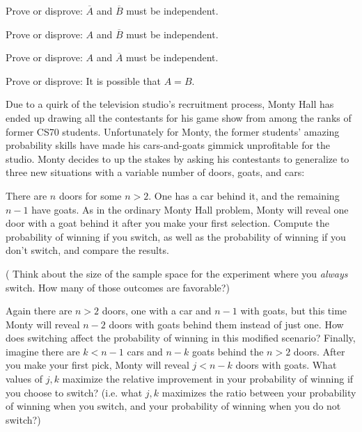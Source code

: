 \documentclass[11pt]{article}
\begin{document}
\begin{Parts}

\Part Prove or disprove: $\overline{A}$ and $\overline{B}$ must be independent.

\Part Prove or disprove: $A$ and $\overline{B}$ must be independent.

\Part Prove or disprove: $A$ and $\overline{A}$ must be independent.

\Part Prove or disprove: It is possible that $A=B$.

\end{Parts}


Due to a quirk of the television studio's recruitment process, Monty Hall has
ended up drawing all the contestants for his game show from among the ranks of
former CS70 students. Unfortunately for Monty, the former students' amazing
probability skills have made his cars-and-goats gimmick unprofitable for the
studio. Monty decides to up the stakes by asking his contestants to generalize
to three new situations with a variable number of doors, goats, and cars:

\begin{Parts}
    \Part There are $n$ doors for some $n > 2$. One has a car behind it, and the
        remaining $n-1$ have goats. As in the ordinary Monty Hall problem, Monty
        will reveal one door with a goat behind it after you make your first
        selection. Compute the probability of winning if you switch, as well as the probability of winning if you don't switch, and compare the results.

        ( Think about the size of the sample space for the
        experiment where you \textit{always} switch. How many of those outcomes
        are favorable?)

    \Part Again there are $n > 2$ doors, one with a car and $n-1$ with goats, but
        this time Monty will reveal $n-2$ doors with goats behind them instead
        of just one. How does switching affect the probability of winning in this
        modified scenario?
    \Part Finally, imagine there are $k<n-1$ cars and $n-k$ goats behind the
        $n>2$ doors. After you make your first pick, Monty will reveal $j<n-k$
        doors with goats. What values of $j, k$ maximize the relative
        improvement in your probability of winning if you choose to switch? (i.e. what
        $j, k$ maximizes the ratio between your probability of winning when you switch,
        and your probability of winning when you do not switch?)
\end{Parts}
\end{document}
